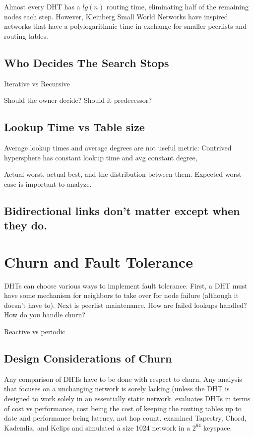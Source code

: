 \documentclass[10pt,letterpaper]{report}
\begin{document}
Almost every DHT has a $lg(n)$ routing time, eliminating  half of the remaining nodes each step.
However, Kleinberg Small World Networks have inspired networks that have a polylogarithmic time in exchange for smaller peerlists and routing tables.



\subsection{Who Decides The Search Stops}
Iterative vs Recursive

Should the owner decide?  Should it predecessor?

\subsection{Lookup Time vs Table size}

Average lookup times and average degrees are not useful metric:
Contrived hypersphere has constant lookup time and avg constant degree,



Actual worst, actual best, and the distribution between them.  Expected worst case is important to analyze.

\subsection{Bidirectional links don't matter except when they do.}

\section{Churn and Fault Tolerance}  %

DHTs can choose various ways to implement fault tolerance.  First, a DHT must have some mechanism for neighbors to take over for node failure (although it doesn't have to).  Next is peerlist maintenance.  How are failed lookups handled?  How do you handle churn?


Reactive vs periodic


\subsection{Design Considerations of Churn}

Any comparison of DHTs have to be done with respect to churn.    Any analysis  that focuses on a unchanging network is sorely lacking (unless the DHT is designed to work solely in an essentially static network. \cite{lichurn}  evaluates DHTs in terms of cost vs performance, cost being the cost of keeping the routing tables up to date and performance being latency, not hop count.  \cite{lichurn} examined Tapestry, Chord, Kademlia, and Kelips and simulated a size 1024 network in a $2^64$ keyspace.   
\end{document}
